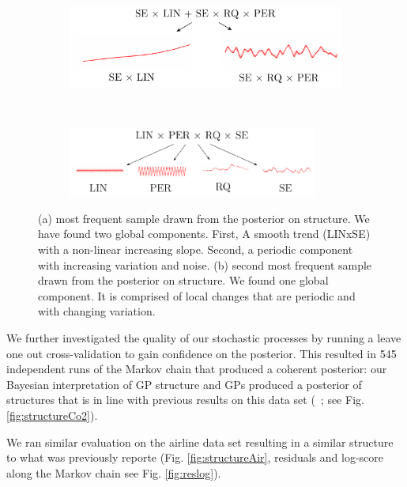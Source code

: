 \begin{figure}
        \centering
        \begin{subfigure}[b]{\textwidth} \centering
                \includegraphics[width=\textwidth]{figs/airline_struct_1.pdf}\caption{}
        \end{subfigure}\\
	\begin{subfigure}[b]{\textwidth} \centering
                \includegraphics[width=0.9\textwidth]{figs/airline_struct_2.pdf}\caption{}
        \end{subfigure}%
        \caption{(a) most frequent sample drawn from the posterior on structure. We have found two global components. First, A smooth trend (LINxSE) with a non-linear increasing slope. Second, a periodic component with increasing variation and noise. (b) second most frequent sample drawn from the posterior on structure. We found one global component. It is comprised of local changes that are periodic and with changing variation.}\label{fig:posterior_twosamples}
\end{figure}
We further investigated the quality of our stochastic processes by running a leave one out cross-validation to gain confidence on the posterior. This resulted in 545 independent runs of the Markov chain that produced a coherent posterior: our Bayesian interpretation of GP structure and GPs produced a posterior of structures that is in line with previous results on this data set (~\citealp*{duvenaud2013structure}; see Fig. \ref{fig:structureCo2}).

We ran similar evaluation on the airline data set resulting in a similar structure to what was previously reporte (Fig. \ref{fig:structureAir}, residuals and log-score along the Markov chain see Fig. \ref{fig:reslog}).

